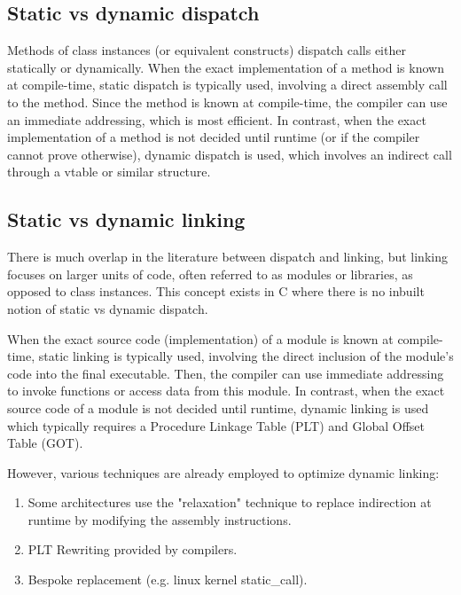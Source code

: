 \documentclass[12pt,a4paper,twoside]{report}
\begin{document}
\subsection{Static vs dynamic dispatch}

Methods of class instances (or equivalent constructs) dispatch calls either statically or dynamically. When the exact implementation of a method is known at compile-time, static dispatch is typically used, involving a direct assembly call to the method. Since the method is known at compile-time, the compiler can use an immediate addressing, which is most efficient. In contrast, when the exact implementation of a method is not decided until runtime (or if the compiler cannot prove otherwise), dynamic dispatch is used, which involves an indirect call through a vtable or similar structure.

\subsection{Static vs dynamic linking}

There is much overlap in the literature between dispatch and linking, but linking focuses on larger units of code, often referred to as modules or libraries, as opposed to class instances. This concept exists in C where there is no inbuilt notion of static vs dynamic dispatch.

When the exact source code (implementation) of a module is known at compile-time, static linking is typically used, involving the direct inclusion of the module's code into the final executable. Then, the compiler can use immediate addressing to invoke functions or access data from this module. In contrast, when the exact source code of a module is not decided until runtime, dynamic linking is used which typically requires a Procedure Linkage Table (PLT) and Global Offset Table (GOT).

However, various techniques are already employed to optimize dynamic linking:

\begin{enumerate}
  \item Some architectures use the "relaxation" technique to replace indirection at runtime by modifying the assembly instructions.
  \item  PLT Rewriting provided by compilers.
  \item Bespoke replacement (e.g. linux kernel static\_call).
\end{enumerate} 
\end{document}
